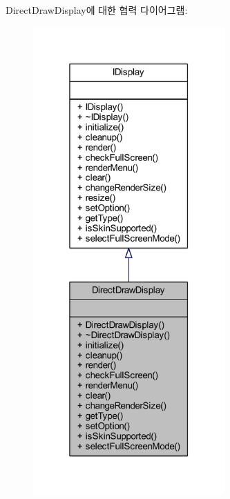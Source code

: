 Direct\+Draw\+Display에 대한 협력 다이어그램\+:\nopagebreak
\begin{figure}[H]
\begin{center}
\leavevmode
\includegraphics[width=208pt]{class_direct_draw_display__coll__graph}
\end{center}
\end{figure}
